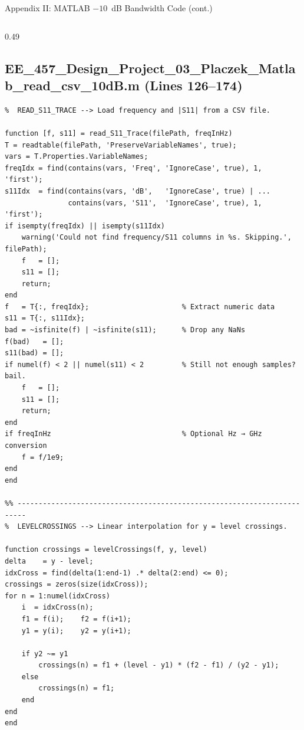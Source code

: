 \documentclass[compress,aspectratio=169,10pt]{beamer}
\begin{document}
\begin{frame}[fragile]{Appendix II: MATLAB $-10$~dB Bandwidth Code (cont.)}
\begin{columns}[T]
\begin{column}{0.49\textwidth}
\subsection[$-10$ dB code 4]{EE\_457\_Design\_Project\_03\_Placzek\_Matlab\_read\_csv\_10dB.m (Lines 126--174)}
            \begin{lstlisting}[firstnumber=126]
%% ------------------------------------------------------------------------
%  READ_S11_TRACE --> Load frequency and |S11| from a CSV file.

function [f, s11] = read_S11_Trace(filePath, freqInHz)
T = readtable(filePath, 'PreserveVariableNames', true);
vars = T.Properties.VariableNames;
freqIdx = find(contains(vars, 'Freq', 'IgnoreCase', true), 1, 'first');
s11Idx  = find(contains(vars, 'dB',   'IgnoreCase', true) | ...
               contains(vars, 'S11',  'IgnoreCase', true), 1, 'first');
if isempty(freqIdx) || isempty(s11Idx)
    warning('Could not find frequency/S11 columns in %s. Skipping.', filePath);
    f   = [];
    s11 = [];
    return;
end
f   = T{:, freqIdx};                      % Extract numeric data
s11 = T{:, s11Idx};
bad = ~isfinite(f) | ~isfinite(s11);      % Drop any NaNs
f(bad)   = [];
s11(bad) = [];
if numel(f) < 2 || numel(s11) < 2         % Still not enough samples? bail.
    f   = [];
    s11 = [];
    return;
end
if freqInHz                               % Optional Hz → GHz conversion
    f = f/1e9;
end
end

%% ------------------------------------------------------------------------
%  LEVELCROSSINGS --> Linear interpolation for y = level crossings.

function crossings = levelCrossings(f, y, level)
delta    = y - level;
idxCross = find(delta(1:end-1) .* delta(2:end) <= 0);
crossings = zeros(size(idxCross));
for n = 1:numel(idxCross)
    i  = idxCross(n);
    f1 = f(i);    f2 = f(i+1);
    y1 = y(i);    y2 = y(i+1);

    if y2 ~= y1
        crossings(n) = f1 + (level - y1) * (f2 - f1) / (y2 - y1);
    else
        crossings(n) = f1;
    end
end
end
            \end{lstlisting}
        \end{column}
    \end{columns}
\end{frame}
\end{document}
